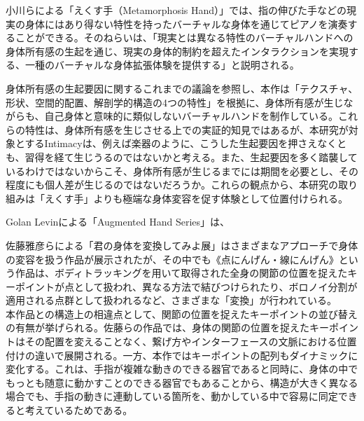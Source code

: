 小川らによる「えくす手（Metamorphosis Hand）」\cite{ekusute}では、指の伸びた手などの現実の身体にはあり得ない特性を持ったバーチャルな身体を通じてピアノを演奏することができる。そのねらいは、「現実とは異なる特性のバーチャルハンドへの身体所有感の生起を通じ、現実の身体的制約を超えたインタラクションを実現する、一種のバーチャルな身体拡張体験を提供する」と説明される。

身体所有感の生起要因に関するこれまでの議論を参照し、本作は「テクスチャ、形状、空間的配置、解剖学的構造の4つの特性」を根拠に、身体所有感が生じながらも、自己身体と意味的に類似しないバーチャルハンドを制作している。これらの特性は、身体所有感を生じさせる上での実証的知見ではあるが、本研究が対象とするIntimacyは、例えば楽器のように、こうした生起要因を押さえなくとも、習得を経て生じうるのではないかと考える。また、生起要因を多く踏襲しているわけではないからこそ、身体所有感が生じるまでには期間を必要とし、その程度にも個人差が生じるのではないだろうか。これらの観点から、本研究の取り組みは「えくす手」よりも極端な身体変容を促す体験として位置付けられる。

Golan Levinによる「Augmented Hand Series」\cite{augmented_hand_series}は、

佐藤雅彦らによる「君の身体を変換してみよ展」はさまざまなアプローチで身体の変容を扱う作品が展示されたが、その中でも《点にんげん・線にんげん》\cite{sato_icc}という作品は、ボディトラッキングを用いて取得された全身の関節の位置を捉えたキーポイントが点として扱われ、異なる方法で結びつけられたり、ボロノイ分割が適用される点群として扱われるなど、さまざまな「変換」が行われている。\\
本作品との構造上の相違点として、関節の位置を捉えたキーポイントの並び替えの有無が挙げられる。佐藤らの作品では、身体の関節の位置を捉えたキーポイントはその配置を変えることなく、繋げ方やインターフェースの文脈における位置付けの違いで展開される。一方、本作ではキーポイントの配列もダイナミックに変化する。これは、手指が複雑な動きのできる器官であると同時に、身体の中でもっとも随意に動かすことのできる器官でもあることから、構造が大きく異なる場合でも、手指の動きに連動している箇所を、動かしている中で容易に同定できると考えているためである。


